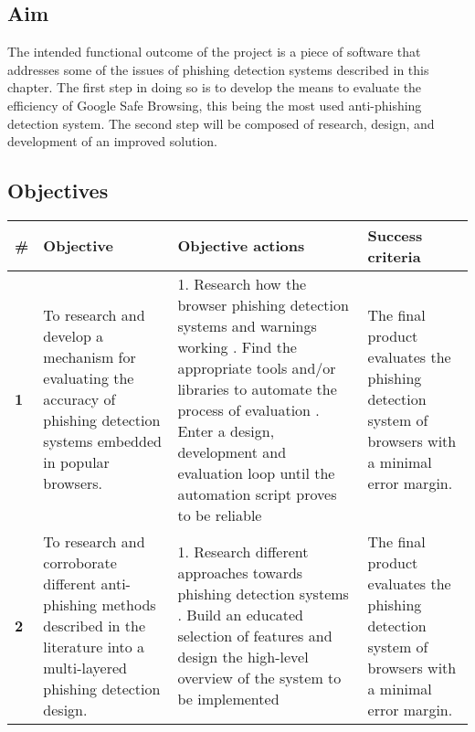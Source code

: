 \subsection{Aim}
The intended functional outcome of the project is a piece of software that
addresses some of the issues of phishing detection systems described in this
chapter. The first step in doing so is to develop the means to evaluate the
efficiency of Google Safe Browsing, this being the most used anti-phishing
detection system. The second step will be composed of research, design, and
development of an improved solution.

\begin{landscape}
	\begin{singlespace}
		\subsection{Objectives}
		\begin{center}
			\label{tab:OBJECTIVES}
			\begin{tabular}{ | m{0.5em} | m{18.5em} | m{23em}| m{16em} | }
				\hline
				\textbf{\#} & \textbf{Objective} & \textbf{Objective actions} &
				\textbf{Success criteria}                                       \\
				\hline
				\textbf{1}  &
				To research and develop a mechanism for evaluating the
				accuracy of phishing detection systems embedded in popular
				browsers.
				            &
				1. Research how the browser phishing detection systems and
				warnings working
				\newline\newline
				2. Find the appropriate tools and/or libraries to automate the
				process of evaluation
				\newline\newline
				2. Enter a design, development and evaluation loop until the
				automation script proves to be reliable
				            &
				The final product evaluates the phishing detection system of
				browsers with a minimal error margin.                           \\


				\hline
				\textbf{2}  &
				To  research and corroborate different anti-phishing methods
				described in the literature into a multi-layered phishing
				detection design.
				            &
				1. Research different approaches towards phishing detection
				systems
				\newline\newline
				2. Build an educated selection of features and design the
				high-level overview of the system to be implemented
				            &
				The final product evaluates the phishing detection system of
				browsers with a minimal error margin.                           \\



\end{tabular}
\end{center}
\end{singlespace}
\end{landscape}
